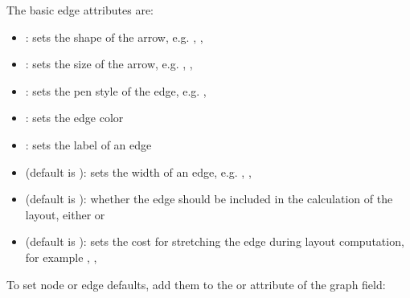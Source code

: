 \documentclass[letterpaper,10pt,english]{sphinxmanual}
\begin{document}
The basic edge attributes are:
\begin{itemize}
\item {} 
: sets the shape of the arrow, e.g. , , 

\item {} 
: sets the size of the arrow, e.g. , , 

\item {} 
: sets the pen style of the edge, e.g. , 

\item {} 
: sets the edge color

\item {} 
: sets the label of an edge

\item {} 
 (default is ): sets the width of an edge, e.g. , , 

\item {} 
 (default is ): whether the edge should be included in the calculation of the layout, either  or 

\item {} 
 (default is ): sets the cost for stretching the edge during layout computation, for example , , 

\end{itemize}

To set node or edge defaults, add them to the  or  attribute of the graph field:
\end{document}
